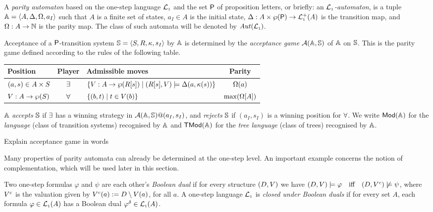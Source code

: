 \begin{definition} \label{def:partityaut}
A \emph{parity automaton} based on the one-step language $\mathcal{L}_{\scriptscriptstyle 1}$ and the set
$\mathsf{P}$ of proposition letters, or briefly: an \emph{$\mathcal{L}_{\scriptscriptstyle 1}$-automaton}, is a 
tuple $\mathbb{A} = \langle{A,\Delta,\Omega,a_I}\rangle$ such that $A$ is a finite set of states,
$a_I \in A$ is the initial state, $\Delta: A\times \wp(\mathsf{P}) \to \mathcal{L}_{\scriptscriptstyle 1}^+(A)$
is the transition map, and $\Omega: A \to \mathbb{N}$ is the parity map.
The class of such automata will be denoted by $\mathit{Aut}(\mathcal{L}_{\scriptscriptstyle 1})$.

Acceptance of a $\mathsf{P}$-transition system $\mathbb{S} = 
\langle{S,R,\kappa,s_I}\rangle$ by $\mathbb{A}$ is determined by the \emph{acceptance 
game} $\mathcal{A}(\mathbb{A},\mathbb{S})$ of $\mathbb{A}$ on $\mathbb{S}$. 
This is the parity game defined according to the rules of the following table.
\begin{center}
\small
\begin{tabular}{|l|c|l|c|} \hline
Position & Player & Admissible moves & Parity \\
\hline
    $(a,s) \in A \times S$
  & $\exists$
  & $\{V : A \to \wp(R[s]) \mid (R[s],V) \models \Delta (a, \kappa(s)) \}$
  & $\Omega(a)$ 
\\
    $V : A \rightarrow \wp(S)$
  & $\forall$
  & $\{(b,t) \mid t \in V(b)\}$
  & $\max(\Omega[A])$
\\ \hline
 \end{tabular}
\end{center}
%
$\mathbb{A}$ \emph{accepts} $\mathbb{S}$ if $\exists$ has a winning strategy in 
$\mathcal{A}(\mathbb{A},\mathbb{S})@(a_I,s_I)$, and \emph{rejects} $\mathbb{S}$ if $(a_I,s_I)$ is 
a winning position for $\forall$. 
We write $\mathsf{Mod}(\mathbb{A})$ for the \emph{language} (class of transition systems) 
recognised by $\mathbb{A}$ and $\mathsf{TMod}(\mathbb{A})$ for the \emph{tree language} (class of 
trees) recognised by $\mathbb{A}$.
\end{definition}

\btbs
\item
Explain acceptance game in words
\etbs

Many properties of parity automata can already be determined at the one-step
level.
An important example concerns the notion of complementation, which will be used
later in this section.

\begin{definition}
\label{d:bdual1}
Two one-step formulas $\varphi$ and $\psi$ are each other's \emph{Boolean dual}
if for every structure $(D,V)$ we have $(D,\val) \models \varphi\quad
\text{iff}\quad (D,\val^{c}) \not\models \psi$, where $V^{c}$ is the 
valuation given by $V^{c}(a) \mathrel{:=} D \setminus V(a)$, for all $a$.
%
A one-step language $\mathcal{L}_{\scriptscriptstyle 1}$ is \emph{closed under Boolean duals} if for every
set $A$, each formula $\varphi \in \mathcal{L}_{\scriptscriptstyle 1}(A)$ has a Boolean dual $\varphi^{\delta}
\in \mathcal{L}_{\scriptscriptstyle 1}(A)$.
\end{definition}

